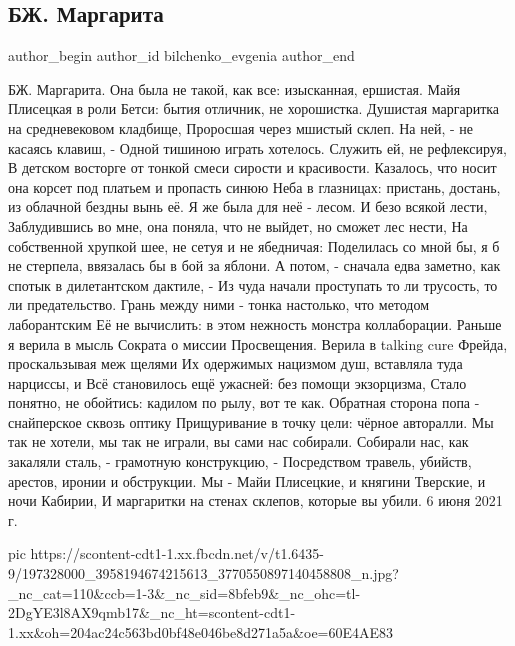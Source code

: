  
 
 
 
 
 
\subsection{БЖ. Маргарита}
\label{sec:06_06_2021.fb.bilchenko_evgenia.2.margarita}
\ifcmt
 author_begin
   author_id bilchenko_evgenia
 author_end
\fi

БЖ. Маргарита.
Она была не такой, как все: изысканная, ершистая.
Майя Плисецкая в роли Бетси: бытия отличник, не хорошистка.
Душистая маргаритка на средневековом кладбище,
Проросшая через мшистый склеп. На ней, - не касаясь клавиш, -
Одной тишиною играть хотелось. Служить ей, не рефлексируя,
В детском восторге от тонкой смеси сирости и красивости.
Казалось, что носит она корсет под платьем и пропасть синюю
Неба в глазницах: пристань, достань, из облачной бездны вынь её.
Я же была для неё - лесом. И безо всякой лести,
Заблудившись во мне, она поняла, что не выйдет, но сможет лес нести,
На собственной хрупкой шее, не сетуя и не ябедничая:
Поделилась со мной бы, я б не стерпела, ввязалась бы в бой за яблони.
А потом, - сначала едва заметно, как спотык в дилетантском дактиле, -
Из чуда начали проступать то ли трусость, то ли предательство.
Грань между ними - тонка настолько, что методом лаборантским
Её не вычислить:  в этом нежность монстра коллаборации.
Раньше я верила в мысль Сократа о миссии Просвещения.
Верила в talking cure Фрейда, проскальзывая меж щелями
Их одержимых нацизмом душ, вставляла туда нарциссы, и
Всё становилось ещё ужасней: без помощи экзорцизма,
Стало понятно, не обойтись: кадилом по рылу, вот те как.
Обратная сторона попа - снайперское сквозь оптику
Прищуривание в точку цели: чёрное авторалли.
Мы так не хотели, мы так не играли, вы сами нас собирали.
Собирали нас, как закаляли сталь, - грамотную конструкцию, -
Посредством травель, убийств, арестов, иронии и обструкции.
Мы - Майи Плисецкие, и княгини Тверские, и ночи Кабирии,
И маргаритки на стенах склепов, которые вы убили.
6 июня 2021 г.

\ifcmt
  pic https://scontent-cdt1-1.xx.fbcdn.net/v/t1.6435-9/197328000_3958194674215613_3770550897140458808_n.jpg?_nc_cat=110&ccb=1-3&_nc_sid=8bfeb9&_nc_ohc=tl-2DgYE3l8AX9qmb17&_nc_ht=scontent-cdt1-1.xx&oh=204ac24c563bd0bf48e046be8d271a5a&oe=60E4AE83
\fi
